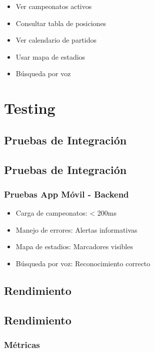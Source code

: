 \documentclass[
  spanish,
  11pt,
  letterpaper,
]{book}
\providecommand{\tightlist}{%
  \setlength{\itemsep}{0pt}\setlength{\parskip}{0pt}}
\begin{document}
\begin{itemize}
\tightlist
\item
  Ver campeonatos activos
\item
  Consultar tabla de posiciones
\item
  Ver calendario de partidos
\item
  Usar mapa de estadios
\item
  Búsqueda por voz
\end{itemize}

\part{Testing}

\chapter{Pruebas de Integración}\label{pruebas-de-integraciuxf3n}

\chapter{Pruebas de Integración}\label{pruebas-de-integraciuxf3n-1}

\section{Pruebas App Móvil -
Backend}\label{pruebas-app-muxf3vil---backend}

\begin{itemize}
\tightlist
\item
  Carga de campeonatos: \textless{} 200ms
\item
  Manejo de errores: Alertas informativas
\item
  Mapa de estadios: Marcadores visibles
\item
  Búsqueda por voz: Reconocimiento correcto
\end{itemize}

\chapter{Rendimiento}\label{rendimiento}

\chapter{Rendimiento}\label{rendimiento-1}

\section{Métricas}\label{muxe9tricas-1}
\end{document}
